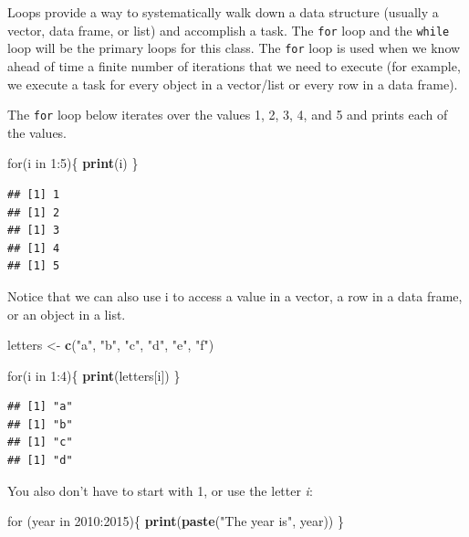 \documentclass[]{book}
\newenvironment{Shaded}{\begin{snugshade}}{\end{snugshade}}
\newcommand{\KeywordTok}[1]{\textcolor[rgb]{0.13,0.29,0.53}{\textbf{{#1}}}}
\newcommand{\DecValTok}[1]{\textcolor[rgb]{0.00,0.00,0.81}{{#1}}}
\newcommand{\StringTok}[1]{\textcolor[rgb]{0.31,0.60,0.02}{{#1}}}
\newcommand{\NormalTok}[1]{{#1}}
\begin{document}
Loops provide a way to systematically walk down a data structure
(usually a vector, data frame, or list) and accomplish a task. The
\texttt{for} loop and the \texttt{while} loop will be the primary loops
for this class. The \texttt{for} loop is used when we know ahead of time
a finite number of iterations that we need to execute (for example, we
execute a task for every object in a vector/list or every row in a data
frame).

The \texttt{for} loop below iterates over the values 1, 2, 3, 4, and 5
and prints each of the values.

\begin{Shaded}
\begin{Highlighting}[]
\NormalTok{for(i in }\DecValTok{1}\NormalTok{:}\DecValTok{5}\NormalTok{)\{}
  \KeywordTok{print}\NormalTok{(i)}
\NormalTok{\}}
\end{Highlighting}
\end{Shaded}

\begin{verbatim}
## [1] 1
## [1] 2
## [1] 3
## [1] 4
## [1] 5
\end{verbatim}

Notice that we can also use i to access a value in a vector, a row in a
data frame, or an object in a list.

\begin{Shaded}
\begin{Highlighting}[]
\NormalTok{letters <-}\StringTok{ }\KeywordTok{c}\NormalTok{(}\StringTok{"a"}\NormalTok{, }\StringTok{"b"}\NormalTok{, }\StringTok{"c"}\NormalTok{, }\StringTok{"d"}\NormalTok{, }\StringTok{"e"}\NormalTok{, }\StringTok{"f"}\NormalTok{)}

\NormalTok{for(i in }\DecValTok{1}\NormalTok{:}\DecValTok{4}\NormalTok{)\{}
  \KeywordTok{print}\NormalTok{(letters[i])}
\NormalTok{\}}
\end{Highlighting}
\end{Shaded}

\begin{verbatim}
## [1] "a"
## [1] "b"
## [1] "c"
## [1] "d"
\end{verbatim}

You also don't have to start with 1, or use the letter \emph{i}:

\begin{Shaded}
\begin{Highlighting}[]
\NormalTok{for (year in }\DecValTok{2010}\NormalTok{:}\DecValTok{2015}\NormalTok{)\{}
  \KeywordTok{print}\NormalTok{(}\KeywordTok{paste}\NormalTok{(}\StringTok{"The year is"}\NormalTok{, year))}
\NormalTok{\}}
\end{Highlighting}
\end{Shaded}
\end{document}
